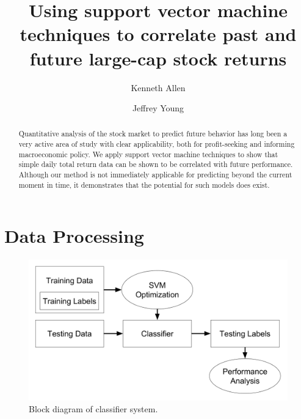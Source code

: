 \documentclass[format=acmlarge]{acmart}
\begin{document}
\title{Using support vector machine techniques to correlate past and future large-cap stock returns}

\author{Kenneth Allen}

\author{Jeffrey Young}

\begin{abstract}
Quantitative analysis of the stock market to predict future behavior has long been a very active area of study with clear applicability, both for profit-seeking and informing macroeconomic policy.  We apply support vector machine techniques to show that simple daily total return data can be shown to be correlated with future performance.  Although our method is not immediately applicable for predicting beyond the current moment in time, it demonstrates that the potential for such models does exist.
\end{abstract}


\maketitle

\section{Data Processing}
\begin{figure}
  \includegraphics{block-diagram}
  \caption{Block diagram of classifier system.}
  \label{fig:one}
\end{figure}
\end{document}
